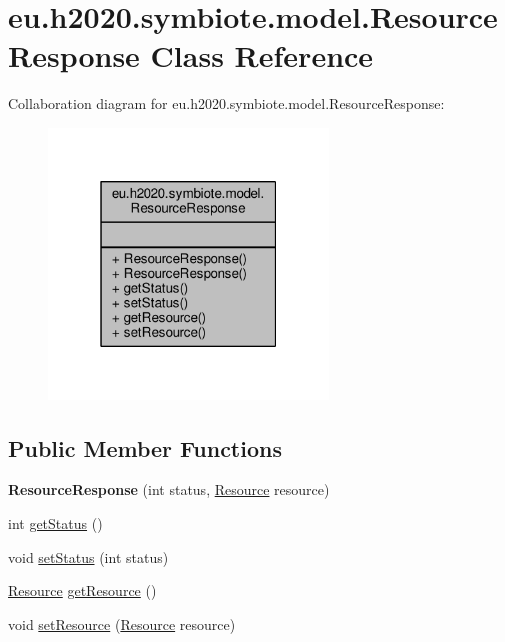 \hypertarget{classeu_1_1h2020_1_1symbiote_1_1model_1_1ResourceResponse}{}\section{eu.\+h2020.\+symbiote.\+model.\+Resource\+Response Class Reference}
\label{classeu_1_1h2020_1_1symbiote_1_1model_1_1ResourceResponse}


Collaboration diagram for eu.\+h2020.\+symbiote.\+model.\+Resource\+Response\+:
\nopagebreak
\begin{figure}[H]
\begin{center}
\leavevmode
\includegraphics[width=211pt]{classeu_1_1h2020_1_1symbiote_1_1model_1_1ResourceResponse__coll__graph}
\end{center}
\end{figure}
\subsection*{Public Member Functions}
\begin{DoxyCompactItemize}
\item 
{\bfseries Resource\+Response} (int status, \hyperlink{classeu_1_1h2020_1_1symbiote_1_1model_1_1Resource}{Resource} resource)\hypertarget{classeu_1_1h2020_1_1symbiote_1_1model_1_1ResourceResponse_ad0141ca2e9efa0c7e25e40fcf62a476e}{}\label{classeu_1_1h2020_1_1symbiote_1_1model_1_1ResourceResponse_ad0141ca2e9efa0c7e25e40fcf62a476e}

\item 
int \hyperlink{classeu_1_1h2020_1_1symbiote_1_1model_1_1ResourceResponse_a291fd5f67222ea0f011793defaab2683}{get\+Status} ()
\item 
void \hyperlink{classeu_1_1h2020_1_1symbiote_1_1model_1_1ResourceResponse_ae7de4f16857ef5c7ed1d272684d2aa8d}{set\+Status} (int status)
\item 
\hyperlink{classeu_1_1h2020_1_1symbiote_1_1model_1_1Resource}{Resource} \hyperlink{classeu_1_1h2020_1_1symbiote_1_1model_1_1ResourceResponse_ac366edd9f5b18a37ad1f1935e5cc60f5}{get\+Resource} ()
\item 
void \hyperlink{classeu_1_1h2020_1_1symbiote_1_1model_1_1ResourceResponse_a65d8ae38a592038757a450b0e3bfe52b}{set\+Resource} (\hyperlink{classeu_1_1h2020_1_1symbiote_1_1model_1_1Resource}{Resource} resource)
\end{DoxyCompactItemize}


